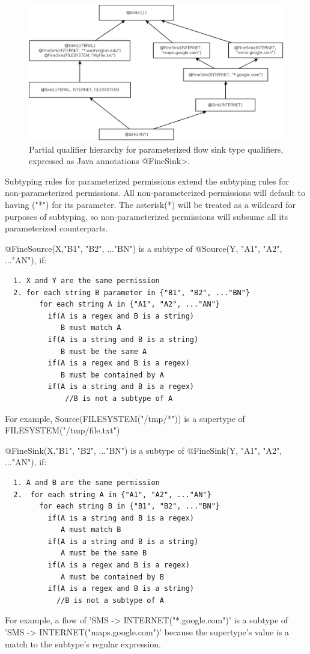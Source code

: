 \begin{figure}
\centerline{\includegraphics[width=1.0\textwidth]{figures/flowsinks_parameterized}}
\caption{Partial qualifier hierarchy for parameterized flow sink type
  qualifiers, expressed as Java annotations \<@FineSink>.}
\label{fig:flow-hierarchy-parameterized-sink}
\end{figure}

Subtyping rules for parameterized permissions extend the subtyping rules for
non-parameterized permissions. All non-parameterized permissions will default
to having ("*") for its parameter. The asterisk(*) will be treated as a wildcard
for purposes of subtyping, so non-parameterized permissions will subsume all
its parameterized counterparts. 

\noindent
@FineSource(X,{"B1", "B2", ..."BN"}) is a subtype of @Source(Y, {"A1", "A2", ..."AN"}), 
if:
\begin{Verbatim}
  1. X and Y are the same permission
  2. for each string B parameter in {"B1", "B2", ..."BN"}
        for each string A in {"A1", "A2", ..."AN"}
          if(A is a regex and B is a string)
             B must match A
          if(A is a string and B is a string)
             B must be the same A
          if(A is a regex and B is a regex)
             B must be contained by A
          if(A is a string and B is a regex)
              //B is not a subtype of A
\end{Verbatim}

For example, Source(FILESYSTEM("/tmp/*")) is a supertype of FILESYSTEM("/tmp/file.txt")\newline

\noindent
@FineSink(X,{"B1", "B2", ..."BN"}) is a subtype of @FineSink(Y, {"A1", "A2", ..."AN"}), 
if:
\begin{Verbatim}
  1. A and B are the same permission
  2.  for each string A in {"A1", "A2", ..."AN"}
        for each string B in {"B1", "B2", ..."BN"}
          if(A is a string and B is a regex)
             A must match B
          if(A is a string and B is a string)
             A must be the same B
          if(A is a regex and B is a regex)
             A must be contained by B
          if(A is a regex and B is a string)
            //B is not a subtype of A
\end{Verbatim}
For example, a flow of 'SMS -> INTERNET("*.google.com")' is a subtype of 
'SMS -> INTERNET("maps.google.com")' because the supertype's value is a match to 
the subtype's regular expression.

